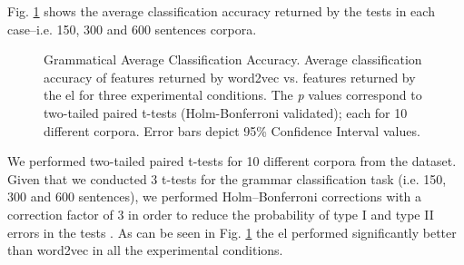 {Fig. \ref{fig:PLOT} shows the average classification accuracy returned by the tests in each case--i.e. 150, 300 and 600 sentences corpora. 

\begin{figure}[h!]
    \centering
    \caption{Grammatical Average Classification Accuracy. Average classification accuracy of features returned by word2vec vs. features returned by the \gls{el} for three experimental conditions. The \emph{p} values correspond to two-tailed paired t-tests (Holm-Bonferroni validated); each for 10 different corpora. Error bars depict 95\% Confidence Interval values.}
    \label{fig:PLOT}
\end{figure}
  
We performed two-tailed paired t-tests for 10 different corpora from the dataset. Given that we conducted 3 t-tests for the grammar classification task (i.e. 150, 300 and 600 sentences), we performed Holm–Bonferroni corrections with a correction factor of 3 in order to reduce the probability of
type I and type II errors in the tests \cite{10.1093/biomet/75.2.383}. As can be seen in Fig. \ref{fig:PLOT} the \gls{el} performed significantly better than word2vec in all the experimental conditions.
}


















